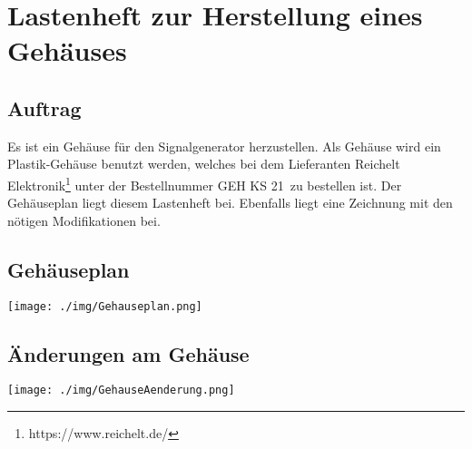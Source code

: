 \section{Lastenheft zur Herstellung eines Gehäuses}
\subsection{Auftrag}
Es ist ein Gehäuse für den Signalgenerator herzustellen. Als Gehäuse wird ein Plastik-Gehäuse benutzt werden, welches bei dem Lieferanten Reichelt Elektronik\footnote{https://www.reichelt.de/} unter der Bestellnummer \glqq GEH KS 21\grqq\ zu bestellen ist. Der Gehäuseplan liegt diesem Lastenheft bei. Ebenfalls liegt eine Zeichnung mit den nötigen Modifikationen bei.

\subsection{Gehäuseplan}
\begin{center}
\texttt{[image: ./img/Gehauseplan.png]}
\end{center}

\subsection{Änderungen am Gehäuse}
\begin{center}
\texttt{[image: ./img/GehauseAenderung.png]}
\end{center}